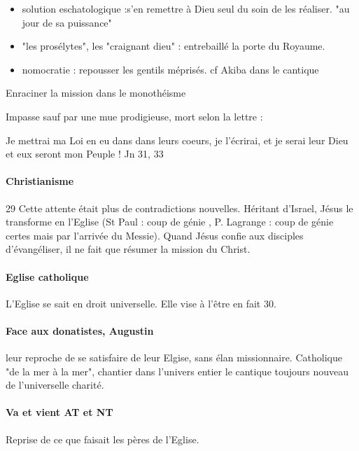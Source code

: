 \begin{itemize}
    \item solution eschatologique :s'en remettre à Dieu seul du soin de les réaliser.  "au jour de sa puissance"
    \item "les prosélytes", les "craignant dieu" : entrebaillé la porte du Royaume.
    \item nomocratie : repousser les gentils méprisés. cf Akiba dans le cantique
\end{itemize}

\begin{Synthesis}
    Enraciner la mission dans le monothéisme
\end{Synthesis}

Impasse sauf par une mue prodigieuse, mort selon la lettre :
\begin{singlequote}
    Je mettrai ma Loi en eu dans dans leurs coeurs, je l'écrirai, et je serai leur Dieu et eux seront mon Peuple ! Jn 31, 33
\end{singlequote}

\paragraph{Christianisme} 29
Cette attente était plus de contradictions nouvelles.
Héritant d'Israel, Jésus le transforme en l'Eglise (St Paul : coup de génie , P. Lagrange : coup de génie certes mais par l'arrivée du Messie).
Quand Jésus confie aux disciples d'évangéliser, il ne fait que résumer la mission du Christ.


\paragraph{Eglise catholique} L'Eglise se sait en droit universelle. Elle vise à l'être en fait 30.

\paragraph{Face aux donatistes, Augustin} leur reproche de se satisfaire de leur Elgise, sans élan missionnaire. Catholique "de la mer à la mer", chantier dans l'univers entier le cantique toujours nouveau de l'universelle charité. 


\paragraph{Va et vient AT et NT} Reprise de ce que faisait les pères de l'Eglise.

